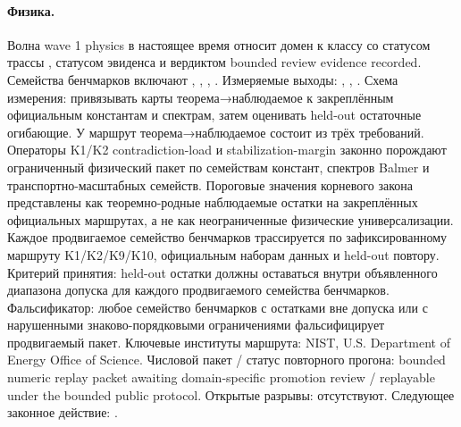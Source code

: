 \paragraph{Физика.}
Волна wave 1 physics в настоящее время относит домен к классу  со статусом трассы , статусом эвиденса  и вердиктом bounded review evidence recorded.
Семейства бенчмарков включают , \allowbreak {}, \allowbreak {}, \allowbreak {}.
Измеряемые выходы: , \allowbreak {}, \allowbreak {}.
Схема измерения: привязывать карты теорема→наблюдаемое к закреплённым официальным константам и спектрам, затем оценивать held-out остаточные огибающие.
У маршрут теорема→наблюдаемое состоит из трёх требований. Операторы K1/K2 contradiction-load и stabilization-margin законно порождают ограниченный физический пакет по семействам констант, спектров Balmer и транспортно-масштабных семейств. Пороговые значения корневого закона представлены как теоремно-родные наблюдаемые остатки на закреплённых официальных маршрутах, а не как неограниченные физические универсализации. Каждое продвигаемое семейство бенчмарков трассируется по зафиксированному маршруту K1/K2/K9/K10, официальным наборам данных и held-out повтору.
Критерий принятия: held-out остатки должны оставаться внутри объявленного диапазона допуска для каждого продвигаемого семейства бенчмарков.
Фальсификатор: любое семейство бенчмарков с остатками вне допуска или с нарушенными знаково-порядковыми ограничениями фальсифицирует продвигаемый пакет.
Ключевые институты маршрута: NIST, \allowbreak U.S. Department of Energy Office of Science.
Числовой пакет / статус повторного прогона: bounded numeric replay packet awaiting domain-specific promotion review / replayable under the bounded public protocol.
Открытые разрывы: отсутствуют.
Следующее законное действие: .

